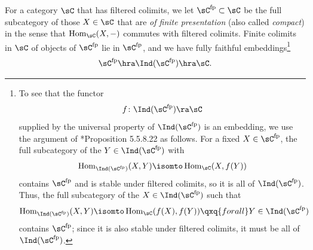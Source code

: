  \label{sfp-fun}
For a category $\sC$ that has filtered colimits, we let $\sC^{\mathrm{fp}} \subset \sC$ be the full subcategory of those $X \in \sC$ that are \emph{of finite presentation} (also called \emph{compact}) in the sense that $\Hom_\sC(X, -)$ commutes with filtered colimits. Finite colimits in $\sC$ of objects of $\sC^{\mathrm{fp}}$ lie in $\sC^{\mathrm{fp}}$, and we have fully faithful embeddings\footnote{\label{cat-foot} To see that the functor
\[
f\colon \Ind(\sC^{\mathrm{fp}}) \ra \sC
\]
supplied by the universal property of $\Ind(\sC^{\mathrm{fp}})$ is an embedding, we use the argument of \cite{HTT}*{Proposition 5.5.8.22} as follows. For a fixed $X \in \sC^{\mathrm{fp}}$, the full subcategory of the $Y \in \Ind(\sC^{\mathrm{fp}})$ with
\[
\Hom_{\Ind(\sC^{\mathrm{fp}})}(X, Y) \isomto \Hom_\sC(X, f(Y))
\]
contains $\sC^{\mathrm{fp}}$ and is stable under filtered colimits, so it is all of $\Ind(\sC^{\mathrm{fp}})$. Thus, the full subcategory of the $X \in \Ind(\sC^{\mathrm{fp}})$ such that
\[
\Hom_{\Ind(\sC^{\mathrm{fp}})}(X, Y) \isomto \Hom_\sC(f(X), f(Y)) \qxq{for all} Y \in \Ind(\sC^{\mathrm{fp}})
\]
contains $\sC^{\mathrm{fp}}$; since it is also stable under filtered colimits, it must be all of $\Ind(\sC^{\mathrm{fp}})$.} %
\[
\sC^{\mathrm{fp}} \hra \Ind(\sC^{\mathrm{fp}}) \hra \sC.
\]

